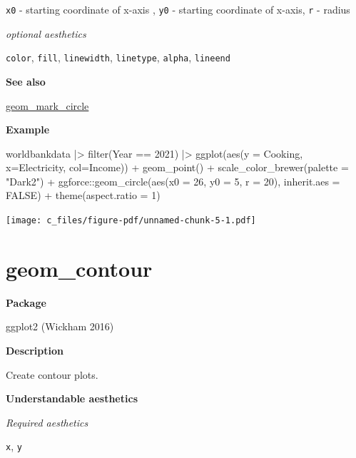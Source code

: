 \documentclass[
  letterpaper,
  DIV=11,
  numbers=noendperiod]{scrreprt}
\newenvironment{Shaded}{\begin{snugshade}}{\end{snugshade}}
\newcommand{\AttributeTok}[1]{\textcolor[rgb]{0.40,0.45,0.13}{#1}}
\newcommand{\ConstantTok}[1]{\textcolor[rgb]{0.56,0.35,0.01}{#1}}
\newcommand{\DecValTok}[1]{\textcolor[rgb]{0.68,0.00,0.00}{#1}}
\newcommand{\FunctionTok}[1]{\textcolor[rgb]{0.28,0.35,0.67}{#1}}
\newcommand{\NormalTok}[1]{\textcolor[rgb]{0.00,0.23,0.31}{#1}}
\newcommand{\SpecialCharTok}[1]{\textcolor[rgb]{0.37,0.37,0.37}{#1}}
\newcommand{\StringTok}[1]{\textcolor[rgb]{0.13,0.47,0.30}{#1}}
\begin{document}
\texttt{x0} - starting coordinate of x-axis , \texttt{y0} - starting
coordinate of x-axis, \texttt{r} - radius

\emph{optional aesthetics}

\texttt{color}, \texttt{fill}, \texttt{linewidth}, \texttt{linetype},
\texttt{alpha}, \texttt{lineend}

\textbf{See also}

\hyperref[mark_circle]{geom\_mark\_circle}

\textbf{Example}

\begin{Shaded}
\begin{Highlighting}[]
\NormalTok{worldbankdata }\SpecialCharTok{|\textgreater{}}
  \FunctionTok{filter}\NormalTok{(Year }\SpecialCharTok{==} \DecValTok{2021}\NormalTok{) }\SpecialCharTok{|\textgreater{}}
\FunctionTok{ggplot}\NormalTok{(}\FunctionTok{aes}\NormalTok{(}\AttributeTok{y =}\NormalTok{ Cooking, }\AttributeTok{x=}\NormalTok{Electricity, }\AttributeTok{col=}\NormalTok{Income)) }\SpecialCharTok{+} 
  \FunctionTok{geom\_point}\NormalTok{() }\SpecialCharTok{+} 
  \FunctionTok{scale\_color\_brewer}\NormalTok{(}\AttributeTok{palette =} \StringTok{"Dark2"}\NormalTok{) }\SpecialCharTok{+}
\NormalTok{  ggforce}\SpecialCharTok{::}\FunctionTok{geom\_circle}\NormalTok{(}\FunctionTok{aes}\NormalTok{(}\AttributeTok{x0 =} \DecValTok{26}\NormalTok{, }\AttributeTok{y0 =} \DecValTok{5}\NormalTok{, }\AttributeTok{r =} \DecValTok{20}\NormalTok{),}
              \AttributeTok{inherit.aes =} \ConstantTok{FALSE}\NormalTok{) }\SpecialCharTok{+} 
    \FunctionTok{theme}\NormalTok{(}\AttributeTok{aspect.ratio =} \DecValTok{1}\NormalTok{)}
\end{Highlighting}
\end{Shaded}

\texttt{[image: c\_files/figure-pdf/unnamed-chunk-5-1.pdf]}

\section{geom\_contour}\label{contour}

\textbf{Package}

ggplot2 (Wickham 2016)

\textbf{Description}

Create contour plots.

\textbf{Understandable aesthetics}

\emph{Required aesthetics}

\texttt{x}, \texttt{y}
\end{document}
